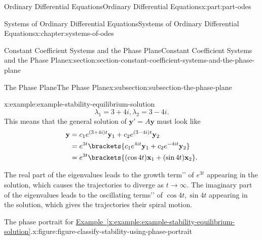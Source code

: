 \documentclass[twoside,10pt,]{book}
\newcommand{\xreffont}{\relax}
\numberwithin{equation}{part}
\renewcommand{\vec}[1]{\mathbf{#1}}
\newcommand{\amp}{&}
\begin{document}
\begin{partptx}{Ordinary Differential Equations}{}{Ordinary Differential Equations}{}{}{x:part:part-odes}
\begin{chapterptx}{Systems of Ordinary Differential Equations}{}{Systems of Ordinary Differential Equations}{}{}{x:chapter:systems-of-odes}
\begin{sectionptx}{Constant Coefficient Systems and the Phase Plane}{}{Constant Coefficient Systems and the Phase Plane}{}{}{x:section:section-constant-coefficient-systems-and-the-phase-plane}
\begin{subsectionptx}{The Phase Plane}{}{The Phase Plane}{}{}{x:subsection:subsection-the-phase-plane}
\begin{example}{}{x:example:example-stability-equilibrium-solution}
\begin{equation*}
\lambda_{1} = 3+4i,\lambda_{2} = 3-4i.
\end{equation*}
This means that the general solution of \(\vec{y}' = A\vec{y}\) must look like%
\begin{align*}
\vec{y} \amp = c_{1}e^{(3+4i)t}\vec{y}_{1} + c_{2}e^{(3-4i)t}\vec{y}_{2}\\
\amp = e^{3t}\brackets{c_{1}e^{4it}\vec{y}_{1}+c_{2}e^{-4it}\vec{y}_{2}}\\
\amp = e^{3t}\brackets{(\cos4t)\vec{x}_{1}+(\sin4t)\vec{x}_{2}}\text{.}
\end{align*}
%
\par
The real part of the eigenvalues leads to the \textasciigrave{}\textasciigrave{}growth term'{}'{} of \(e^{3t}\) appearing in the solution, which causes the trajectories to diverge as \(t\to\infty\). The imaginary part of the eigenvalues leads to the \textasciigrave{}\textasciigrave{}oscillating terms'{}'{} of \(\cos4t,\sin4t\) appearing in the solution, which gives the trajectories their spiral motion.%
\end{example}
\begin{figureptx}{The phase portrait for \hyperref[x:example:example-stability-equilibrium-solution]{Example~{\xreffont\ref{x:example:example-stability-equilibrium-solution}}}.}{x:figure:figure-classify-stability-using-phase-portrait}{}%
\begin{image}{0.25}{0.5}{0.25}%

\end{image}
\end{figureptx}
\end{subsectionptx}
\end{sectionptx}
\end{chapterptx}
\end{partptx}
\end{document}
